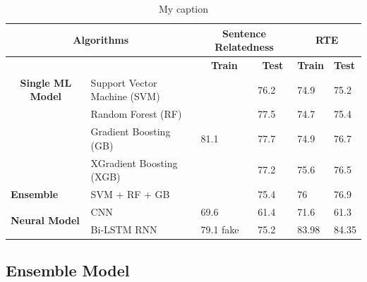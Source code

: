 \documentclass[12pt]{report} %
\begin{document}
\begin{table}[]
	\centering
	\caption{My caption}
	\label{my-label}
	\begin{tabular}{|l|l|l|l|l|l|}
		\hline
		\multicolumn{2}{|c|}{\textbf{Algorithms}}                                     & \multicolumn{2}{c|}{\textbf{Sentence Relatedness}}                       & \multicolumn{2}{c|}{\textbf{RTE}}                   \\ \hline
		&                              & \multicolumn{1}{c|}{\textbf{Train}} & \multicolumn{1}{c|}{\textbf{Test}} & \multicolumn{1}{c|}{\textbf{Train}} & \textbf{Test} \\ \hline
		\multicolumn{1}{|c|}{\textbf{Single ML Model}} & Support Vector Machine (SVM) &                                     & 76.2                               & 74.9                                & 75.2          \\ \hline
		& Random Forest (RF)           &                                     & 77.5                               & 74.7                                & 75.4          \\ \hline
		& Gradient Boosting (GB)       & 81.1                                & 77.7                               & 74.9                                & 76.7          \\ \hline
		\textbf{}                                      & XGradient Boosting (XGB)     &                                     & 77.2                               & 75.6                                & 76.5          \\ \hline
		\textbf{Ensemble}                              & SVM + RF + GB                &                                     & 75.4                               & 76                                  & 76.9          \\ \hline
		\multirow{2}{*}{\textbf{Neural Model}}         & CNN                          & 69.6                                & 61.4                               & 71.6                                & 61.3          \\ \cline{2-6} 
		& Bi-LSTM RNN                  & 79.1 fake                           & 75.2                               & 83.98                               & 84.35         \\ \hline
	\end{tabular}
\end{table}

\subsection{Ensemble Model}
\end{document}
